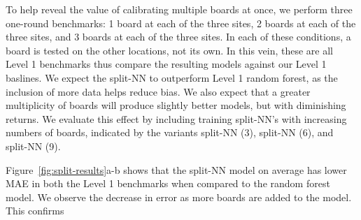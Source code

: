 \documentclass[journal abbreviation, manuscript]{copernicus}
\begin{document}
To help reveal the value of calibrating multiple boards at once, we perform three one-round benchmarks: 1 board at each of the three sites, 2 boards at each of the three sites, and 3 boards at each of the three sites.  In each of these conditions, a board is tested on the other locations, not its own.  In this vein, these are all Level 1 benchmarks thus compare the resulting models against our Level 1 baslines. We expect the split-NN to outperform Level 1 random forest, as the inclusion of more data helps reduce bias. We also expect that a greater multiplicity of boards will produce slightly better models, but with diminishing returns. We evaluate this effect by including training split-NN's with increasing numbers of boards, indicated by the variants split-NN (3), split-NN (6), and split-NN (9).

 Figure~\ref{fig:split-results}a-b shows that the split-NN model on average has lower MAE in both the Level 1 benchmarks when compared to the random forest model. We observe the decrease in error as more boards are added to the model. This confirms 
\end{document}
